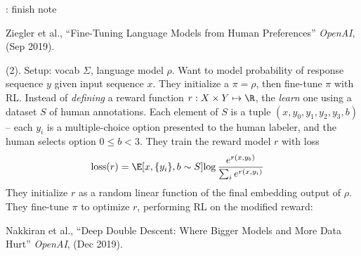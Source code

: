 \documentclass[11pt]{article}
\newcommand\myspace[1][]{\vspace{#1\bigskipamount}}
\newcommand\p{\Needspace{10\baselineskip} \noindent}
\newcommand\bluesec[1]{\myspace \p \blue{#1}}
\begin{document}
: finish note










\vspace{-1em}
{\footnotesize Ziegler et al., ``Fine-Tuning Language Models from Human Preferences'' \textit{OpenAI}, (Sep 2019).}


\bluesec{Methods} (2). Setup: vocab $\Sigma$, language model $\rho$. Want to model probability of response sequence $y$ given input sequence $x$.  They initialize a  $\pi = \rho$, then fine-tune $\pi$ with RL. Instead of \textit{defining} a reward function $r: X \times Y \mapsto \R$, the \textit{learn} one using a dataset $S$ of human annotations. Each element of $S$ is a tuple $(x, y_0, y_1, y_2, y_3, b)$ -- each $y_i$ is a multiple-choice option presented to the human labeler, and the human selects option $0 \le b < 3$. They train the reward model $r$ with loss
\begin{align}
	\text{loss}(r)
		&= \E[x, \{y_i\}, b \sim S]{\log \frac{ e^{r(x, y_b)} }{ \sum_i e^{r(x, y_i)}   }}
\end{align}
They initialize $r$ as a random linear function of the final embedding output of $\rho$. They fine-tune $\pi$ to optimize $r$, performing RL on the modified reward:








\vspace{-1em}
{\footnotesize Nakkiran et al., ``Deep Double Descent: Where Bigger Models and More Data Hurt'' \textit{OpenAI}, (Dec 2019).}
\end{document}
